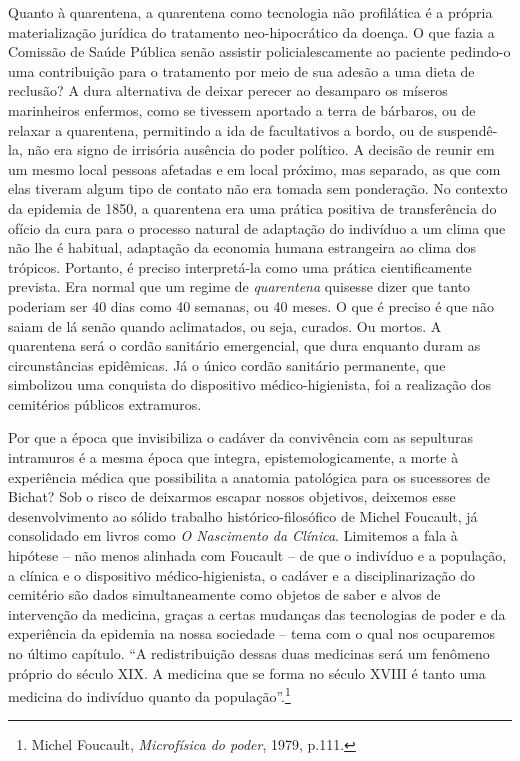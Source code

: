 Quanto à quarentena, a quarentena como tecnologia não profilática é a
própria materialização jurídica do tratamento neo-hipocrático da doença.
O que fazia a Comissão de Saúde Pública senão assistir policialescamente
ao paciente pedindo-o uma contribuição para o tratamento por meio de sua
adesão a uma dieta de reclusão? A dura alternativa de deixar perecer ao
desamparo os míseros marinheiros enfermos, como se tivessem aportado a
terra de bárbaros, ou de relaxar a quarentena, permitindo a ida de
facultativos a bordo, ou de suspendê-la, não era signo de irrisória
ausência do poder político. A decisão de reunir em um mesmo local
pessoas afetadas e em local próximo, mas separado, as que com elas
tiveram algum tipo de contato não era tomada sem ponderação. No contexto
da epidemia de 1850, a quarentena era uma prática positiva de
transferência do ofício da cura para o processo natural de adaptação do
indivíduo a um clima que não lhe é habitual, adaptação da economia
humana estrangeira ao clima dos trópicos. Portanto, é preciso
interpretá-la como uma prática cientificamente prevista. Era normal que
um regime de \emph{quarentena} quisesse dizer que tanto poderiam ser 40
dias como 40 semanas, ou 40 meses. O que é preciso é que não saiam de lá
senão quando aclimatados, ou seja, curados. Ou mortos. A quarentena será
o cordão sanitário emergencial, que dura enquanto duram as
circunstâncias epidêmicas. Já o único cordão sanitário permanente, que
simbolizou uma conquista do dispositivo médico-higienista, foi a
realização dos cemitérios públicos extramuros.

Por que a época que invisibiliza o cadáver da convivência com as
sepulturas intramuros é a mesma época que integra, epistemologicamente,
a morte à experiência médica que possibilita a anatomia patológica para
os sucessores de Bichat? Sob o risco de deixarmos escapar nossos
objetivos, deixemos esse desenvolvimento ao sólido trabalho
histórico-filosófico de Michel Foucault, já consolidado em livros como
\emph{O Nascimento da Clínica}. Limitemos a fala à hipótese -- não menos
alinhada com Foucault -- de que o indivíduo e a população, a clínica e o
dispositivo médico-higienista, o cadáver e a disciplinarização do
cemitério são dados simultaneamente como objetos de saber e alvos de
intervenção da medicina, graças a certas mudanças das tecnologias de
poder e da experiência da epidemia na nossa sociedade -- tema com o qual
nos ocuparemos no último capítulo. ``A redistribuição dessas duas
medicinas será um fenômeno próprio do século XIX. A medicina que se
forma no século XVIII é tanto uma medicina do indivíduo quanto da
população''.\footnote{Michel Foucault, \emph{Microfísica do poder},
  1979, p.111.}

